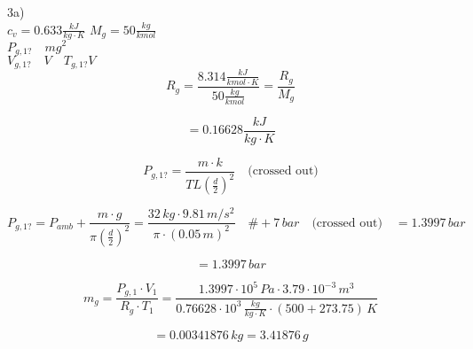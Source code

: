3a) \\
$c_v = 0.633 \frac{kJ}{kg \cdot K}$ \hspace{1cm} $M_g = 50 \frac{kg}{kmol}$ \\

$P_{g,1?} \quad mg^2$ \\

$V_{g,1?} \quad V \quad T_{g,1?} V$ \\

\[
R_g = \frac{8.314 \frac{kJ}{kmol \cdot K}}{50 \frac{kg}{kmol}} = \frac{R_g}{M_g}
\]

\[
= 0.16628 \frac{kJ}{kg \cdot K}
\]

\[
P_{g,1?} = \frac{m \cdot k}{T L \left( \frac{d}{2} \right)^2} \quad \text{(crossed out)}
\]

\[
P_{g,1?} = P_{amb} + \frac{m \cdot g}{\pi \left( \frac{d}{2} \right)^2} = \frac{32 \, kg \cdot 9.81 \, m/s^2}{\pi \cdot (0.05 \, m)^2} \quad \# + 7 \, bar \quad \text{(crossed out)} \quad = 1.3997 \, bar
\]

\[
= 1.3997 \, bar
\]

\[
m_g = \frac{P_{g,1} \cdot V_1}{R_g \cdot T_1} = \frac{1.3997 \cdot 10^5 \, Pa \cdot 3.79 \cdot 10^{-3} \, m^3}{0.76628 \cdot 10^3 \, \frac{kg}{kg \cdot K} \cdot (500 + 273.75) \, K}
\]

\[
= 0.00341876 \, kg = 3.41876 \, g
\]